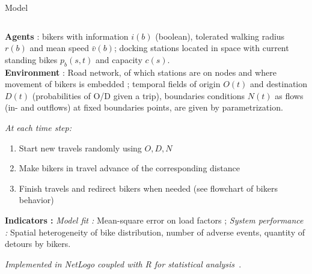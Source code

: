 \documentclass{beamer}
\begin{document}
\begin{frame}{}
\begin{columns}[t]
\begin{column}{.49\textwidth}
\begin{block}{Model}
\begin{columns}[t]
\begin{column}{.95\textwidth}
\begin{justify}
          \medskip
      
          \textbf{Agents} :  bikers with information $i(b)$ (boolean), tolerated walking
radius $r(b)$ and mean speed $\bar{v}(b)$; docking stations located
in space with current standing bikes $p_{b}(s,t)$ and capacity $c(s)$.\\
\medskip
\textbf{Environment} : Road network, of which stations are on nodes and where movement of bikers is embedded ; temporal fields of origin $O(t)$ and destination $D(t)$ (probabilities of O/D given a trip), boundaries conditions $N(t)$ as flows (in- and outflows) at fixed boundaries points, are given by parametrization.
          
          
        \medskip
          \textit{ At each time step:}
          \begin{enumerate}         
    \item{Start new travels randomly using $O,D,N$}
    \item{Make bikers in travel advance of the corresponding distance}
    \item{Finish travels and redirect bikers when needed (see flowchart of bikers behavior)}
    \end{enumerate}

\textbf{Indicators : } \textit{Model fit :} Mean-square error on load factors ; \textit{System performance : } Spatial heterogeneity of bike distribution, number of adverse events, quantity of detours by bikers.

\bigskip 

\textit{Implemented in NetLogo coupled with R for statistical analysis~\cite{impl}}.\\


\vspace{0.5cm}


\end{justify}
\end{column}
\end{columns}
\end{block}
\end{column}
\end{columns}
\end{frame}
\end{document}
